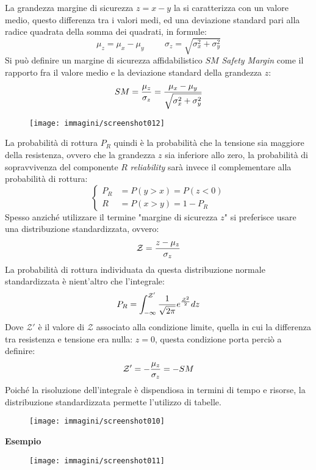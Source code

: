 \documentclass{article}
\begin{document}
\begin{adjustwidth}{2in}{}
     	La grandezza margine di sicurezza $z = x - y$ la si caratterizza con un valore medio, questo differenza tra i valori medi, ed una deviazione standard pari alla radice quadrata della somma dei quadrati, in formule: 
     	\[\mu_z = \mu_x - \mu_y \hspace{1cm} \sigma_z = \sqrt{\sigma_x^2 + \sigma_y^2}\]
     	Si può definire un margine di sicurezza affidabilistico $ SM $ \textit{Safety Margin} come il rapporto fra il valore medio e la deviazione standard della grandezza $z$:
     	\[SM = {\mu_z\over\sigma_z} = \dfrac{\mu_x - \mu_y}{ \sqrt{\sigma_x^2 + \sigma_y^2}}\]
     	\begin{figure}[H]
     		\centering
     		\texttt{[image: immagini/screenshot012]}
     		\label{fig:screenshot012}
     	\end{figure}     	
     	La probabilità di rottura $P_R$ quindi è la probabilità che la tensione sia maggiore della resistenza, ovvero che la grandezza $z$ sia inferiore allo zero, la probabilità di sopravvivenza del componente $ R $ \textit{reliability} sarà invece il complementare alla probabilità di rottura:
     	\[ \begin{cases}
     		P_R & = P(y>x) = P(z<0) \\
     		R & = P(x>y) = 1 - P_R
     	\end{cases} \]     	
     	Spesso anziché utilizzare il termine "margine di sicurezza $z$" si preferisce usare una distribuzione standardizzata, ovvero:
     	\[\mathcal{Z} = {z-\mu_z\over\sigma_z} \]
     	La probabilità di rottura individuata da questa distribuzione normale standardizzata è nient'altro che l'integrale:
     	\[P_R = \int_{-\infty}^{\mathcal{Z}'}{1\over\sqrt{2\pi}}e^{\mathcal{Z}^2\over 2}dz\]
     	Dove $ \mathcal{Z}' $ è il valore di $ \mathcal{Z} $ associato alla condizione limite, quella in cui la differenza tra resistenza e tensione era nulla: $z =0$, questa condizione porta perciò a definire:
     	\[\mathcal{Z}' = -{\mu_z\over\sigma_z} = -SM \]
     	Poiché la risoluzione dell'integrale è dispendiosa in termini di tempo e risorse, la distribuzione standardizzata permette l'utilizzo di tabelle.
     	
     	\begin{figure}[H]
     		\centering
     		\texttt{[image: immagini/screenshot010]}
     		\label{fig:screenshot010}
     	\end{figure}
     	    	
     	\textbf{Esempio} \newline 
     \begin{figure}[H]
     	\centering
     	\texttt{[image: immagini/screenshot011]}
     	\label{fig:screenshot011}
     \end{figure}
     

\end{adjustwidth}
\end{document}

